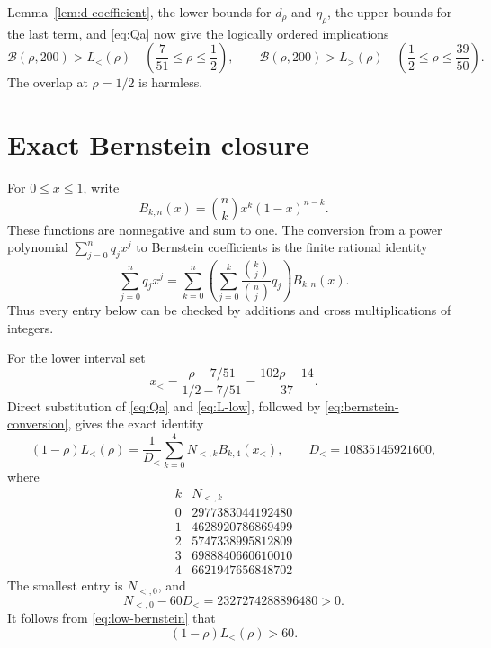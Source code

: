 \documentclass[11pt]{article}
\newcommand{\Bcal}{\mathcal B}
\begin{document}
Lemma~\ref{lem:d-coefficient}, the lower bounds for \(d_\rho\) and
\(\eta_\rho\), the upper bounds for the last term, and
\eqref{eq:Qa} now give the logically ordered implications
\begin{equation}
 \Bcal(\rho,200)>L_<(\rho)
 \quad\left(\frac7{51}\leq\rho\leq\frac12\right),
 \qquad
 \Bcal(\rho,200)>L_>(\rho)
 \quad\left(\frac12\leq\rho\leq\frac{39}{50}\right).
 \label{eq:B-L}
\end{equation}
The overlap at \(\rho=1/2\) is harmless.

\section{Exact Bernstein closure}

For \(0\leq x\leq1\), write
\[
 B_{k,n}(x)=\binom nkx^k(1-x)^{n-k}.
\]
These functions are nonnegative and sum to one.  The conversion from a
power polynomial \(\sum_{j=0}^nq_jx^j\) to Bernstein coefficients is the
finite rational identity
\begin{equation}
 \sum_{j=0}^nq_jx^j
 =\sum_{k=0}^n\left(
   \sum_{j=0}^k\frac{\binom kj}{\binom nj}q_j
  \right)B_{k,n}(x).
 \label{eq:bernstein-conversion}
\end{equation}
Thus every entry below can be checked by additions and cross
multiplications of integers.

For the lower interval set
\[
 x_<=\frac{\rho-7/51}{1/2-7/51}=\frac{102\rho-14}{37}.
\]
Direct substitution of \eqref{eq:Qa} and \eqref{eq:L-low}, followed by
\eqref{eq:bernstein-conversion}, gives the exact identity
\begin{equation}
 (1-\rho)L_<(\rho)
 =\frac1{D_<}\sum_{k=0}^{4}N_{<,k}B_{k,4}(x_<),
 \qquad
 D_<=10835145921600,
 \label{eq:low-bernstein}
\end{equation}
where
\[
\begin{array}{c|r}
k&N_{<,k}\\ \hline
0&2977383044192480\\
1&4628920786869499\\
2&5747338995812809\\
3&6988840660610010\\
4&6621947656848702
\end{array}
\]
The smallest entry is \(N_{<,0}\), and
\[
 N_{<,0}-60D_<=2327274288896480>0.
\]
It follows from \eqref{eq:low-bernstein} that
\begin{equation}
       (1-\rho)L_<(\rho)>60.
       \label{eq:low-sixty}
\end{equation}
\end{document}
